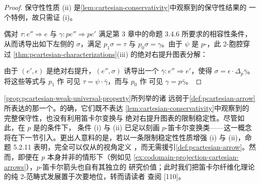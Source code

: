 \begin{proof}
保守性性质 (ii) 是\cref{lem:cartesian-conservativity}中观察到的保守性结果的
一个特例，故只需证 (i)。

偶对 $\tau\colon e''\Rightarrow e$ 与 $\gamma\colon pe''\Rightarrow pe'$
满足第 3 章中的命题 3.4.6 所要求的相容性条件，从而诱导出如下左侧的%
\trNaturalTransformation{} $\sigma$，满足 $p_{1}\sigma=\tau$ 与%
$p_{0}\sigma=\gamma$。由于 $\psi$ 是 $p$-\trCartesian，此 2-胞腔穿过%
\cref{thm:pcartesian-characterizations}(iii) 的绝对右提升图表分解：
\begin{center}
\end{center}
由于 $(e',\epsilon)$ 是绝对右提升，$(e'',\sigma)$ 诱导出一个%
\trNaturalTransformation{} $\bar{\gamma}\colon e''\Rightarrow e'$，使得%
$\sigma=\epsilon\cdot\Delta_{p}\bar{\gamma}$。将这些等式与 $p_{1}$ 作%
\trWhiskering{}可见 $\tau=\psi\cdot\bar{\gamma}$，而与 $p_{0}$ 作%
\trWhiskering{}可见 $\gamma=p\bar{\gamma}$。
\end{proof}

\cref{prop:pcartesian-weak-universal-property}所列举的诸\trUniversalProperty{}%
远弱于\cref{def:pcartesian-arrow}所表达的那一个。的确，它们既不表达%
\cref{lem:cartesian-conservativity}中观察到的完整保守性，也没有利用笛卡尔变换与
绝对右提升图表的限制稳定性。尽管如此，在 $p$ 是\trCartesianFibration{}的条件下，
条件 (i) 与 (ii) 已足以刻画 $p$-笛卡尔变换类——\trCartesianFibration{}这一概念
将在下一节引入。更出人意料的是，若以一条限制稳定性性质增强 (i) 与 (ii)，命题
5.2.11 表明，完全可以仅从\trHomotopyTwoCategory{}的视角定义%
\trCartesianFibration，而无需援引\cref{def:pcartesian-arrow}。然而，即便在%
$p$ 本身并非\trCartesianFibration{}的情形下（例如见%
\cref{ex:codomain-projection-cartesian-arrows}），$p$-笛卡尔箭头也自有其独立的
研究价值；此时我们把笛卡尔纤维化理论的纯 2-范畴式发展置于次要地位，转而请读者
查阅 [110]。


